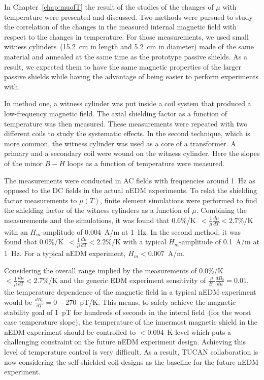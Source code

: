 
In Chapter~\ref{chap:muofT} the result of the studies of the changes
of $\mu$ with temperature were presented and discussed. Two methods
were pursued to study the correlation of the changes in the measured
internal magnetic field with respect to the changes in temperature.
For those measurements, we used small witness cylinders~(15.2~cm in
length and 5.2~cm in diameter) made of the same material and annealed
at the same time as the prototype passive shields. As a result, we
expected them to have the same magnetic properties of the larger
passive shields while having the advantage of being easier to perform
experiments with.


In method one, a witness cylinder was put inside a coil system that
produced a low-frequency magnetic field. The axial shielding factor as
a function of temperature was then measured. These measurements were
repeated with two different coils to study the systematic effects. In
the second technique, which is more common, the witness cylinder was
used as a core of a transformer. A primary and a secondary coil were
wound on the witness cylinder. Here the slopes of the minor $B-H$
loops as a function of temperature were measured.

The measurements were conducted in AC fields with frequencies around
1~Hz as opposed to the DC fields in the actual nEDM experiments. To
relat the shielding factor measurements to $\mu(T)$, finite element
simulations were performed to find the shielding factor of the witness
cylinders as a function of $\mu$. Combining the measurements and the
simulations, it was found that
0.6\%/K~$<\frac{1}{\mu}\frac{d\mu}{dT}<2.7\%$/K with an
$H_m$-amplitude of 0.004~A/m at 1~Hz. In the second method, it was
found that 0.0\%/K~$<\frac{1}{\mu}\frac{d\mu}{dT}<2.2\%$/K with a
typical $H_m$-amplitude of 0.1~A/m at 1~Hz. For a typical nEDM
experiment, $H_m < 0.007$~A/m.

Considering the overall range implied by the measurements of
0.0\%/K~$<\frac{1}{\mu}\frac{d\mu}{dT}<2.7$\%/K and the generic EDM
experiment sensitivity of $\frac{\mu}{B_0}\frac{dB_0}{d\mu}=0.01$, the
temperature dependence of the magnetic field in a typical nEDM
experiment would be $\frac{dB_0}{dT}=0-270$~pT/K. This means, to
safely achieve the magnetic stability goal of 1~pT for hundreds of
seconds in the interal field~(for the worst case temperature slope),
the temperature of the innermost magnetic shield in the nEDM
experiment should be controlled to $<0.004$~K level which puts a
challenging constraint on the future nEDM experiment design. Achieving
this level of temperature control is very difficult. As a result,
TUCAN collaboration is now considering the self-shielded coil designs
as the baseline for the future nEDM experiment.

